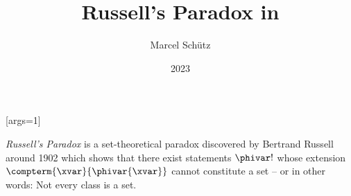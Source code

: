 \documentclass{stex}
\title{Russell's Paradox in \Naproche}
\author{Marcel Schütz}
\date{2023}
\begin{document}
\maketitle

[args=1]{\maincomp{\varphi}}

\noindent \emph{Russell's Paradox} is a set-theoretical paradox discovered by Bertrand Russell around 1902 \cite[chapter XV]{Frege1980} which shows that there exist statements $\phivar!$ whose extension $\compterm{\xvar}{\phivar{\xvar}}$ cannot constitute a set – or in other words: Not every class is a set.


\printbibliography
\end{document}
